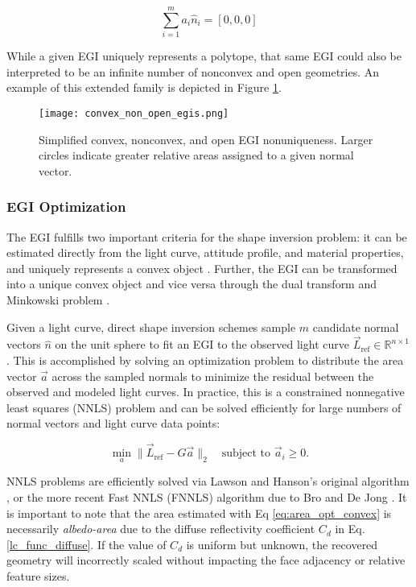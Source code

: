 \begin{equation} \label{eq:egi_closure}
  \sum_{i=1}^m a_i \hat{n}_i = [0, 0, 0]
\end{equation}

While a given EGI uniquely represents a polytope, that same EGI could also be interpreted to be an infinite number of nonconvex and open geometries. An example of this extended family is depicted in Figure \ref{fig:egi_family}.

\begin{figure}[!htb]
  \centering
  \texttt{[image: convex\_non\_open\_egis.png]}
  \caption{Simplified convex, nonconvex, and open EGI nonuniqueness. Larger circles indicate greater relative areas assigned to a given normal vector.}
  \label{fig:egi_family}
\end{figure}

\subsubsection{EGI Optimization}

The EGI fulfills two important criteria for the shape inversion problem: it can be estimated directly from the light curve, attitude profile, and material properties, and uniquely represents a convex object \cite{kaasalainen2001}. Further, the EGI can be transformed into a unique convex object and vice versa through the dual transform and Minkowski problem \cite{little1985, minkowski1909}. 

Given a light curve, direct shape inversion schemes sample $m$ candidate normal vectors $\hat{n}$ on the unit sphere to fit an EGI to the observed light curve $\vec{L}_\textrm{ref} \in \mathbb{R}^{n \times 1}$ \cite{friedman2020, fan2020thesis}. This is accomplished by solving an optimization problem to distribute the area vector $\vec{a}$ across the sampled normals to minimize the residual between the observed and modeled light curves. In practice, this is a constrained nonnegative least squares (NNLS) problem and can be solved efficiently for large numbers of normal vectors and light curve data points:

\begin{equation} \label{eq:area_opt_convex}
  \min_{a}{\|\vec{L}_{\textrm{ref}} - G \vec{a}\|_2} \:\:\: \textrm{ subject to } \vec{a}_i \geq 0.
\end{equation}

NNLS problems are efficiently solved via Lawson and Hanson's original algorithm \cite{lawson1976}, or the more recent Fast NNLS (FNNLS) algorithm due to Bro and De Jong \cite{bro1996}. It is important to note that the area estimated with Eq \ref{eq:area_opt_convex} is necessarily \textit{albedo-area} due to the diffuse reflectivity coefficient $C_d$ in Eq. \ref{lc_func_diffuse}. If the value of $C_d$ is uniform but unknown, the recovered geometry will incorrectly scaled without impacting the face adjacency or relative feature sizes.

